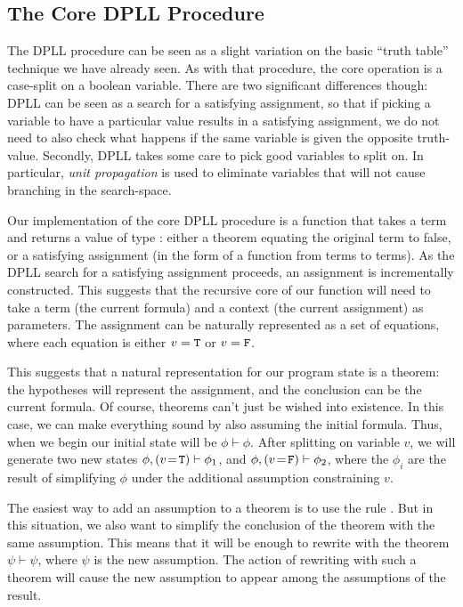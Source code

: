 \subsection{The Core DPLL Procedure}
\label{sec:dpll-procedure}

The DPLL procedure can be seen as a slight variation on the basic
``truth table'' technique we have already seen.  As with that
procedure, the core operation is a case-split on a boolean variable.
There are two significant differences though: DPLL can be seen as a
search for a satisfying assignment, so that if picking a variable to
have a particular value results in a satisfying assignment, we do not
need to also check what happens if the same variable is given the
opposite truth-value.  Secondly, DPLL takes some care to pick good
variables to split on.  In particular, \emph{unit propagation} is used
to eliminate variables that will not cause branching in the
search-space.

Our implementation of the core DPLL procedure is a function that takes
a term and returns a value of type : either a theorem
equating the original term to false, or a satisfying assignment (in
the form of a function from terms to terms).  As the DPLL search for a
satisfying assignment proceeds, an assignment is incrementally
constructed.  This suggests that the recursive core of our function
will need to take a term (the current formula) and a context (the
current assignment) as parameters.  The assignment can be naturally
represented as a set of equations, where each equation is either $v =
\holtxt{T}$ or $v = \holtxt{F}$.

This suggests that a natural representation for our program state is a
theorem: the hypotheses will represent the assignment, and the
conclusion can be the current formula.  Of course, \HOL{} theorems
can't just be wished into existence.  In this case, we can make
everything sound by also assuming the initial formula.  Thus, when we
begin our initial state will be $\phi\vdash\phi$.  After splitting on
variable $v$, we will generate two new states
$\phi,(v\!=\!\holtxt{T})\vdash \phi_1$, and
$\phi,(v\!=\!\holtxt{F})\vdash \phi_2$, where the $\phi_i$ are the
result of simplifying $\phi$ under the additional assumption
constraining $v$.

The easiest way to add an assumption to a theorem is to use the
rule .  But in this situation, we also want to
simplify the conclusion of the theorem with the same assumption.  This
means that it will be enough to rewrite with the theorem
$\psi\vdash\psi$, where $\psi$ is the new assumption.  The action of
rewriting with such a theorem will cause the new assumption to appear
among the assumptions of the result.

